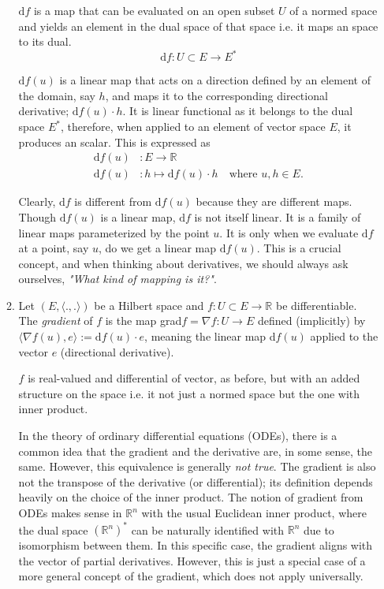 \documentclass{article}
\begin{document}
\begin{enumerate}[start=9]
\begin{enumerate}
\begin{ans_box}
      $\text{d}f$ is a map that can be evaluated on an open subset $U$ of a normed space and yields an element in the dual space of that space i.e. it maps an space to its dual. $$\text{d}f:U\subset E\to E^{*}$$

      $\text{d}f(u)$ is a linear map that acts on a direction defined by an element of the domain, say $h$, and maps it to the corresponding directional derivative; $\text{d}f(u)\cdot h$. It is linear functional as it belongs to the dual space $E^{*}$, therefore, when applied to an element of vector space $E$, it produces an scalar. This is expressed as
      \begin{equation*}
        \begin{split}
          \text{d}f(u)&:E\to \mathbb{R}\\
          \text{d}f(u)&:h\mapsto \text{d}f(u)\cdot h\quad\text{where }u,h\in E.
        \end{split}
      \end{equation*}

    Clearly, $\text{d}f$ is different from $\text{d}f(u)$ because they are different maps. Though $\text{d}f(u)$ is a linear map, $\text{d}f$ is not itself linear. It is a family of linear maps parameterized by the point $u$. It is only when we evaluate $\text{d}f$ at a point, say $u$, do we get a linear map $\text{d}f(u)$. This is a crucial concept, and when thinking about derivatives, we should always ask ourselves, \textit{"What kind of mapping is it?"}.
    \end{ans_box}

    \item Let $(E, \langle.,.\rangle)$ be a Hilbert space and $f:U\subset E\rightarrow\mathbb{R}$ be differentiable. The \textit{gradient} of $f$ is the map grad$f=\nabla f:U\rightarrow E$ defined (implicitly) by $\langle\nabla f(u), e\rangle:=\text{d}f(u)\cdot e$, meaning the linear map d$f(u)$ applied to the vector $e$ (directional derivative).

    \begin{ans_box}
      $f$ is real-valued and differential of vector, as before, but with an added structure on the space i.e. it not just a normed space but the one with inner product.\medskip

      In the theory of ordinary differential equations (ODEs), there is a common idea that the gradient and the derivative are, in some sense, the same. However, this equivalence is generally \textit{not true}. The gradient is also not the transpose of the derivative (or differential); its definition depends heavily on the choice of the inner product. The notion of gradient from ODEs makes sense in $\mathbb{R}^{n}$ with the usual Euclidean inner product, where the dual space $(\mathbb{R}^{n})^{*}$ can be naturally identified with $\mathbb{R}^{n}$ due to isomorphism between them. In this specific case, the gradient aligns with the vector of partial derivatives. However, this is just a special case of a more general concept of the gradient, which does not apply universally.\medskip


\end{ans_box}
\end{enumerate}
\end{enumerate}
\end{document}
